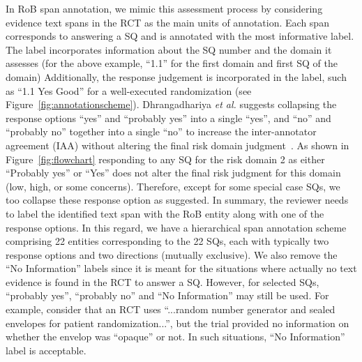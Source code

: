 \documentclass[sn-mathphys,Numbered]{sn-jnl}%
\theoremstyle{thmstyleone}%
\theoremstyle{thmstyletwo}%
\theoremstyle{thmstylethree}%
\begin{document}
In RoB span annotation, we mimic this assessment process by considering evidence text spans in the RCT as the main units of annotation. 
Each span corresponds to answering a SQ and is annotated with the most informative label. 
The label incorporates information about the SQ number and the domain it assesses (for the above example, ``1.1'' for the first domain and first SQ of the domain)
Additionally, the response judgement is incorporated in the label, such as ``1.1 Yes Good'' for a well-executed randomization (see Figure~\ref{fig:annotationscheme}).
Dhrangadhariya \textit{et al.} suggests collapsing the response options ``yes'' and ``probably yes'' into a single ``yes'', and ``no'' and ``probably no'' together into a single ``no'' to increase the inter-annotator agreement (IAA) without altering the final risk domain judgment~\cite{dhrangadhariya2023first}.
As shown in Figure~\ref{fig:flowchart} responding to any SQ for the risk domain 2 as either ``Probably yes'' or ``Yes'' does not alter the final risk judgment for this domain (low, high, or some concerns).
Therefore, except for some special case SQs, we too collapse these response option as suggested.
In summary, the reviewer needs to label the identified text span with the RoB entity along with one of the response options.
In this regard, we have a hierarchical span annotation scheme comprising 22 entities corresponding to the 22 SQs, each with typically two response options and two directions (mutually exclusive).
We also remove the ``No Information'' labels since it is meant for the situations where actually no text evidence is found in the RCT to answer a SQ.
However, for selected SQs, ``probably yes'', ``probably no'' and ``No Information'' may still be used.
For example, consider that an RCT uses ``...random number generator and sealed envelopes for patient randomization...'', but the trial provided no information on whether the envelop was ``opaque'' or not.
In such situations, ``No Information'' label is acceptable.
\end{document}

